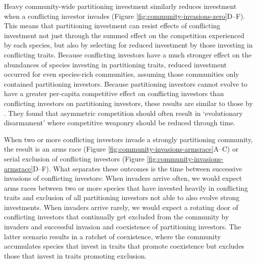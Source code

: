 Heavy community-wide partitioning investment similarly reduces investment when a
conflicting investor invades (Figure \ref{fig:community-invasions-zero}D--F).
This means that partitioning investment can resist effects of conflicting
investment not just through the summed effect on the competition experienced 
by each species, but also by selecting for reduced investment by those
investing in conflicting traits.
Because conflicting investors have a much stronger effect on the abundances
of species investing in partitioning traits, reduced investment occurred
for even species-rich communities, assuming those communities only contained
partitioning investors.
Because partitioning investors cannot evolve to have a greater per-capita
competitive effect on conflicting investors than 
conflicting investors on partitioning investors, 
these results are similar to those by \citet{Kisdi2001}.
They found that asymmetric competition should often result in 
`evolutionary disarmament' where competitive weaponry should be reduced 
through time.



When two or more conflicting investors invade a strongly partitioning community,
the result is an arms race
(Figure \ref{fig:community-invasions-armsrace}A--C)
or serial exclusion of conflicting investors
(Figure \ref{fig:community-invasions-armsrace}D--F).
What separates these outcomes is the time between successive invasions
of conflicting investors:
When invaders arrive often, we would expect arms races between two
or more species that have invested heavily in conflicting traits
and exclusion of all partitioning investors not able to also evolve
strong investments.
When invaders arrive rarely, we would expect a rotating door of conflicting 
investors that continually get excluded from the community by invaders and
successful invasion and coexistence of partitioning investors.
The latter scenario results in a ratchet of coexistence, where the community
accumulates species that invest in traits that promote coexistence but 
excludes those that invest in traits promoting exclusion.











